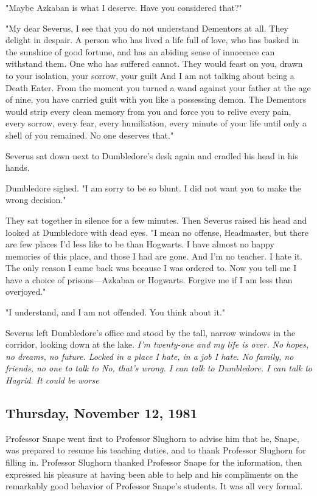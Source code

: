 "Maybe Azkaban is what I deserve. Have you considered that?"

"My dear Severus, I see that you do not understand Dementors at all. They delight in despair. A person who has lived a life full of love, who has basked in the sunshine of good fortune, and has an abiding sense of innocence can withstand them. One who has suffered cannot. They would feast on you, drawn to your isolation, your sorrow, your guilt{\el} And I am not talking about being a Death Eater. From the moment you turned a wand against your father at the age of nine, you have carried guilt with you like a possessing demon. The Dementors would strip every clean memory from you and force you to relive every pain, every sorrow, every fear, every humiliation, every minute of your life until only a shell of you remained. No one deserves that."

Severus sat down next to Dumbledore's desk again and cradled his head in his hands.

Dumbledore sighed. "I am sorry to be so blunt. I did not want you to make the wrong decision."

They sat together in silence for a few minutes. Then Severus raised his head and looked at Dumbledore with dead eyes. "I mean no offense, Headmaster, but there are few places I'd less like to be than Hogwarts. I have almost no happy memories of this place, and those I had are{\el} gone. And I'm no teacher. I hate it. The only reason I came back was because I was ordered to. Now you tell me I have a choice of prisons—Azkaban or Hogwarts. Forgive me if I am less than overjoyed."

"I understand, and I am not offended. You think about it."

Severus left Dumbledore's office and stood by the tall, narrow windows in the corridor, looking down at the lake. \emph{I'm twenty-one and my life is over. No hopes, no dreams, no future. Locked in a place I hate, in a job I hate. No family, no friends, no one to talk to{\el} No, that's wrong. I can talk to Dumbledore. I can talk to Hagrid. It could be worse{\el}}

\subsection{Thursday, November 12, 1981}

Professor Snape went first to Professor Slughorn to advise him that he, Snape, was prepared to resume his teaching duties, and to thank Professor Slughorn for filling in. Professor Slughorn thanked Professor Snape for the information, then expressed his pleasure at having been able to help and his compliments on the remarkably good behavior of Professor Snape's students. It was all very formal.

